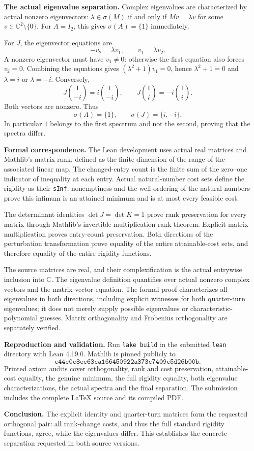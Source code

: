 \documentclass[11pt]{article}
\begin{document}
\newpage
\noindent\textbf{The actual eigenvalue separation.}
Complex eigenvalues are characterized by actual nonzero eigenvectors:
$\lambda\in\sigma(M)$ if and only if $Mv=\lambda v$ for some
$v\in\mathbb C^2\setminus\{0\}$. For $A=I_2$, this gives
$\sigma(A)=\{1\}$ immediately.

For $J$, the eigenvector equations are
\[
 -v_2=\lambda v_1,\qquad v_1=\lambda v_2.
\]
A nonzero eigenvector must have $v_1\ne0$: otherwise the first equation also forces $v_2=0$. Combining the equations gives
$(\lambda^2+1)v_1=0$, hence $\lambda^2+1=0$ and
$\lambda=i$ or $\lambda=-i$. Conversely,
\[
 J\binom{1}{-i}=i\binom{1}{-i},
 \qquad
 J\binom{1}{i}=-i\binom{1}{i}.
\]
Both vectors are nonzero. Thus
\[
 \boxed{\sigma(A)=\{1\},\qquad \sigma(J)=\{i,-i\}.}
\]
In particular $1$ belongs to the first spectrum and not the second, proving that the spectra differ.

\medskip
\noindent\textbf{Formal correspondence.}
The Lean development uses actual real matrices and Mathlib's matrix rank, defined as the finite dimension of the range of the associated linear map. The changed-entry count is the finite sum of the zero--one indicator of inequality at each entry. Actual natural-number cost sets define the rigidity as their \texttt{sInf}; nonemptiness and the well-ordering of the natural numbers prove this infimum is an attained minimum and is at most every feasible cost.

The determinant identities $\det J=\det K=1$ prove rank preservation for every matrix through Mathlib's invertible-multiplication rank theorem. Explicit matrix multiplication proves entry-count preservation. Both directions of the perturbation transformation prove equality of the entire attainable-cost sets, and therefore equality of the entire rigidity functions.

The source matrices are real, and their complexification is the actual entrywise inclusion into $\mathbb C$. The eigenvalue definition quantifies over actual nonzero complex vectors and the matrix-vector equation. The formal proof characterizes all eigenvalues in both directions, including explicit witnesses for both quarter-turn eigenvalues; it does not merely supply possible eigenvalues or characteristic-polynomial guesses. Matrix orthogonality and Frobenius orthogonality are separately verified.

\medskip
\noindent\textbf{Reproduction and validation.}
Run \texttt{lake build} in the submitted \texttt{lean} directory with Lean 4.19.0. Mathlib is pinned publicly to
\[
 \texttt{c44e0c8ee63ca166450922a373c7409c5d26b00b}.
\]
Printed axiom audits cover orthogonality, rank and cost preservation, attainable-cost equality, the genuine minimum, the full rigidity equality, both eigenvalue characterizations, the actual spectra and the final separation. The submission includes the complete LaTeX source and its compiled PDF.

\medskip
\noindent\textbf{Conclusion.}
The explicit identity and quarter-turn matrices form the requested orthogonal pair: all rank-change costs, and thus the full standard rigidity functions, agree, while the eigenvalues differ. This establishes the concrete separation requested in both source versions.
\end{document}
